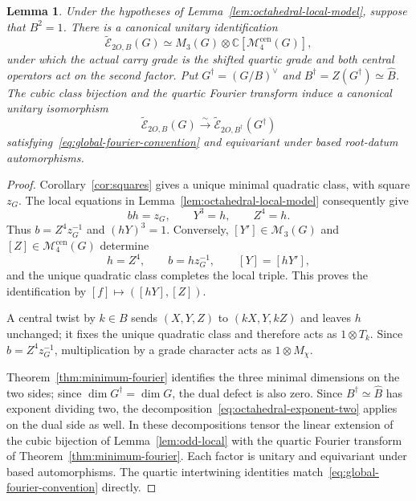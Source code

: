 \documentclass[11pt,a4paper,reqno]{amsart}
\theoremstyle{plain}
\newtheorem{lemma}[theorem]{Lemma}
\theoremstyle{definition}
\theoremstyle{remark}
\numberwithin{equation}{section}
\newcommand{\CC}{\mathbb C}
\newcommand{\cM}{\mathcal M}
\newcommand{\wtE}{\widetilde{\mathcal E}}
\begin{document}
\begin{lemma}\label{lem:octahedral-exponent-two}
Under the hypotheses of Lemma~\ref{lem:octahedral-local-model}, suppose that $B^2=1$. There is a canonical unitary identification
\begin{equation}\label{eq:octahedral-exponent-two}
\wtE_{2O,B}(G)
\simeq M_3(G)\otimes\CC[\cM_4^{\mathrm{cen}}(G)],
\end{equation}
under which the actual carry grade is the shifted quartic grade and both central operators act on the second factor. Put $G^\dagger=(G/B)^\vee$ and $B^\dagger=Z(G^\dagger)\simeq\widehat B$. The cubic class bijection and the quartic Fourier transform induce a canonical unitary isomorphism
\[
\wtE_{2O,B}(G)\xrightarrow{\sim}\wtE_{2O,B^\dagger}(G^\dagger)
\]
satisfying~\eqref{eq:global-fourier-convention} and equivariant under based root-datum automorphisms.
\end{lemma}
\begin{proof}
Corollary~\ref{cor:squares} gives a unique minimal quadratic class, with square $z_G$. The local equations in Lemma~\ref{lem:octahedral-local-model} consequently give
\[
bh=z_G,\qquad Y^3=h,\qquad Z^4=h.
\]
Thus $b=Z^4z_G^{-1}$ and $(hY)^3=1$. Conversely, $[Y']\in\cM_3(G)$ and $[Z]\in\cM_4^{\mathrm{cen}}(G)$ determine
\[
h=Z^4,\qquad b=hz_G^{-1},\qquad [Y]=[hY'],
\]
and the unique quadratic class completes the local triple. This proves the identification by $[f]\mapsto([hY],[Z])$.

A central twist by $k\in B$ sends $(X,Y,Z)$ to $(kX,Y,kZ)$ and leaves $h$ unchanged; it fixes the unique quadratic class and therefore acts as $1\otimes T_k$. Since $b=Z^4z_G^{-1}$, multiplication by a grade character acts as $1\otimes M_\chi$.

Theorem~\ref{thm:minimum-fourier} identifies the three minimal dimensions on the two sides; since $\dim G^\dagger=\dim G$, the dual defect is also zero. Since $B^\dagger\simeq\widehat B$ has exponent dividing two, the decomposition~\eqref{eq:octahedral-exponent-two} applies on the dual side as well. In these decompositions tensor the linear extension of the cubic bijection of Lemma~\ref{lem:odd-local} with the quartic Fourier transform of Theorem~\ref{thm:minimum-fourier}. Each factor is unitary and equivariant under based automorphisms. The quartic intertwining identities match~\eqref{eq:global-fourier-convention} directly.
\end{proof}
\end{document}
